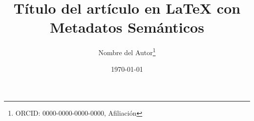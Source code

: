 
\title{Título del artículo en LaTeX con Metadatos Semánticos}  
\author{Nombre del Autor\thanks{ORCID: 0000-0000-0000-0000, Afiliación}}  
\date{\today}  



\usepackage{ccicons}
\newcommand{\licencia}{\ccby \ccnc \ccsa}

\usepackage{xmpincl} %
